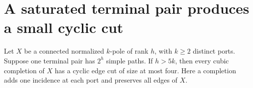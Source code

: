 \section{A saturated terminal pair produces a small cyclic cut}
\label{sec:saturated-pair-small-cut}

\begin{theorem}
\label{thm:saturated-pair-small-cyclic-cut}
Let $X$ be a connected normalized $k$-pole of rank $h$, with $k\ge2$ distinct ports.
Suppose one terminal pair has $2^h$ simple paths.
If $h>5k$, then every cubic completion of $X$ has a cyclic edge cut of size at most four.
Here a completion adds one incidence at each port and preserves all edges of $X$.
\end{theorem}

